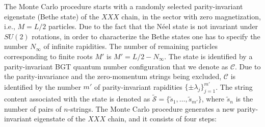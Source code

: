 \documentclass[11pt]{iopart}
\begin{document}
The Monte Carlo procedure starts with a randomly selected parity-invariant eigenstate 
(Bethe state) of the $XXX$ chain, in the sector with zero magnetization, i.e., $M=L/2$ 
particles. Due to the fact that the N\'eel state is not invariant under $SU(2)$ rotations, 
in order to characterize the Bethe states one has to specify the number $N_{\infty}$ of 
infinite rapidities. The number of remaining particles corresponding to finite roots 
$M'$ is $M'=L/2-N_\infty$. The state is identified by a parity-invariant BGT quantum number 
configuration that we denote as ${\mathcal C}$. Due to the parity-invariance and the 
zero-momentum strings being excluded, ${\mathcal C}$ is identified by the number $m'$ 
of parity-invariant rapidities $\{\pm\lambda_j\}_{j=1}^{m'}$. The string content 
associated with the state is denoted as $\widetilde{\mathcal S}=\{\tilde s_1,\dots,
\tilde s_{m'}\}$, where $\tilde s_n$ is the number of pairs of $n$-strings. The Monte 
Carlo procedure generates a new parity-invariant eigenstate of the $XXX$ chain, and 
it consists of four steps: 
%
\end{document}
